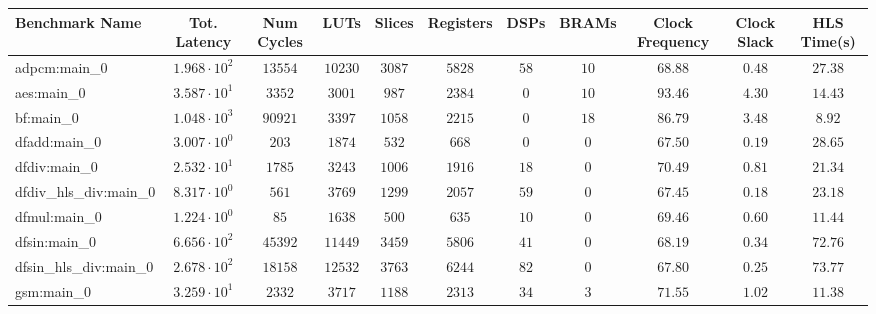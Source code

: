 \begin{tabular}{|l|c|c|c|c|c|c|c|c|c|c|}
\hline
Benchmark Name          & Tot. Latency           & Num Cycles & LUTs      & Slices    & Registers & DSPs    & BRAMs   & Clock Frequency & Clock Slack & HLS Time(s) \\
\hline
adpcm:main\_0           & $ 1.968 \cdot 10^{2} $ & $ 13554  $ & $ 10230 $ & $ 3087  $ & $ 5828  $ & $ 58  $ & $ 10  $ & $ 68.88       $ & $ 0.48    $ & $ 27.38   $ \\
aes:main\_0             & $ 3.587 \cdot 10^{1} $ & $ 3352   $ & $ 3001  $ & $ 987   $ & $ 2384  $ & $ 0   $ & $ 10  $ & $ 93.46       $ & $ 4.30    $ & $ 14.43   $ \\
bf:main\_0              & $ 1.048 \cdot 10^{3} $ & $ 90921  $ & $ 3397  $ & $ 1058  $ & $ 2215  $ & $ 0   $ & $ 18  $ & $ 86.79       $ & $ 3.48    $ & $ 8.92    $ \\
dfadd:main\_0           & $ 3.007 \cdot 10^{0} $ & $ 203    $ & $ 1874  $ & $ 532   $ & $ 668   $ & $ 0   $ & $ 0   $ & $ 67.50       $ & $ 0.19    $ & $ 28.65   $ \\
dfdiv:main\_0           & $ 2.532 \cdot 10^{1} $ & $ 1785   $ & $ 3243  $ & $ 1006  $ & $ 1916  $ & $ 18  $ & $ 0   $ & $ 70.49       $ & $ 0.81    $ & $ 21.34   $ \\
dfdiv\_hls\_div:main\_0 & $ 8.317 \cdot 10^{0} $ & $ 561    $ & $ 3769  $ & $ 1299  $ & $ 2057  $ & $ 59  $ & $ 0   $ & $ 67.45       $ & $ 0.18    $ & $ 23.18   $ \\
dfmul:main\_0           & $ 1.224 \cdot 10^{0} $ & $ 85     $ & $ 1638  $ & $ 500   $ & $ 635   $ & $ 10  $ & $ 0   $ & $ 69.46       $ & $ 0.60    $ & $ 11.44   $ \\
dfsin:main\_0           & $ 6.656 \cdot 10^{2} $ & $ 45392  $ & $ 11449 $ & $ 3459  $ & $ 5806  $ & $ 41  $ & $ 0   $ & $ 68.19       $ & $ 0.34    $ & $ 72.76   $ \\
dfsin\_hls\_div:main\_0 & $ 2.678 \cdot 10^{2} $ & $ 18158  $ & $ 12532 $ & $ 3763  $ & $ 6244  $ & $ 82  $ & $ 0   $ & $ 67.80       $ & $ 0.25    $ & $ 73.77   $ \\
gsm:main\_0             & $ 3.259 \cdot 10^{1} $ & $ 2332   $ & $ 3717  $ & $ 1188  $ & $ 2313  $ & $ 34  $ & $ 3   $ & $ 71.55       $ & $ 1.02    $ & $ 11.38   $ \\

\end{tabular}
